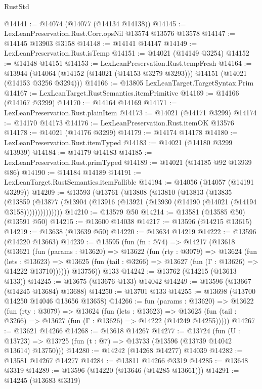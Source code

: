 \begin{lexlean}{RustStd}
\begin{coremodule}
{\begin{coremodule}
{{{{{{{{{{{{{{{{{{{{{{{{{{{{{{{{{{{{{{{@14141 := @14074 (@14077 (@14134 @14138))
@14145 := LexLeanPreservation.Rust.Corr.opsNil @13574 @13576 @13578
@14147 := @14145 @13903 @3158
@14148 := @14141 @14147
@14149 := LexLeanPreservation.Rust.isTemp
@14151 := @14021 (@14149 @3254)
@14152 := @14148 @14151
@14153 := LexLeanPreservation.Rust.tempFresh
@14164 := @13944
    (@14064 (@14152 (@14021 (@14153 @3279 @3293))) @14151 (@14021 (@14153 @3256 @3294)))
@14166 := @13805 LexLeanTarget.TargetSyntax.Prim
@14167 := LexLeanTarget.RustSemantics.itemPrimitive
@14169 := @14166 (@14167 @3299)
@14170 := @14164 @14169
@14171 := LexLeanPreservation.Rust.plainItem
@14173 := @14021 (@14171 @3299)
@14174 := @14170 @14173
@14176 := LexLeanPreservation.Rust.itemOK @13576
@14178 := @14021 (@14176 @3299)
@14179 := @14174 @14178
@14180 := LexLeanPreservation.Rust.itemTyped
@14183 := @14021 (@14180 @3299 @13939)
@14184 := @14179 @14183
@14185 := LexLeanPreservation.Rust.primTyped
@14189 := @14021 (@14185 @92 @13939 @86)
@14190 := @14184 @14189
@14191 := LexLeanTarget.RustSemantics.itemFallible
@14194 := @14056 (@14057 (@14191 @3299))
@14209 := @13593
    (@13761
      (@13808
        (@13810
          (@13813
            (@13835
              (@13859
                (@13877 (@13904 (@13916 (@13921 (@13930 (@14190 (@14021 (@14194 @3158))))))))))))))
@14210 := @13579 @50
@14214 := @13581 (@13585 @50) (@13591 @50)
@14215 := @13600 @14038
@14217 := @13596 (@14215 @13615)
@14219 := @13638 (@13639 @50)
@14220 := @13634 @14219
@14222 := @13596 (@14220 @13663)
@14239 := @13595
    (fun (fn : @74) =>
    @14217
      (@13618
        (@13621
          (fun (params : @13620) =>
          @13622
            (fun (rty : @3079) =>
            @13624
              (fun (lets : @13623) =>
              @13625 (fun (tail : @3266) => @13627 (fun (Γ : @13626) => @14222 @13710))))))
        @13756))
    @133
@14242 := @13762 (@14215 (@13613 @133))
@14245 := @13675 (@13676 @133) @14042
@14249 := @13596 (@13667 (@14245 @13684) @13688)
@14250 := @13701 @133
@14255 := @13698 (@13700 @14250 @14046 @13656 @13658)
@14266 := fun (params : @13620) =>
  @13622
    (fun (rty : @3079) =>
    @13624
      (fun (lets : @13623) =>
      @13625 (fun (tail : @3266) => @13627 (fun (Γ : @13626) => @14222 (@14249 @14255)))))
@14267 := @13621 @14266
@14268 := @13618 @14267
@14277 := @13724
    (fun (U : @13723) => @13725 (fun (t : @7) => @13733 (@13596 (@13739 @14042 @13614) @13750)))
@14280 := @14242 (@14268 @14277) @14039
@14282 := @13581 @14267 @14277
@14284 := @13811 @14266 @3319
@14285 := @13648 @3319
@14289 := @13596 (@14220 (@13646 (@14285 @13661)))
@14291 := @14245 (@13683 @3319)
}}}}}}}}}}}}}}}}}}}}}}}}}}}}}}}}}}}}}}}
\end{coremodule}}
\end{coremodule}
\end{lexlean}
